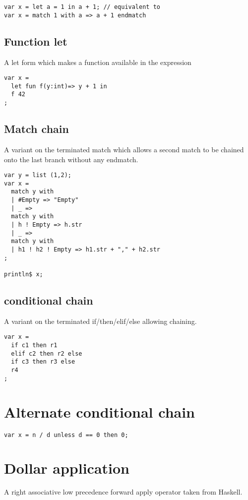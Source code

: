\documentclass[oneside]{book}
\begin{document}
{\begin{verbatim}
var x = let a = 1 in a + 1; // equivalent to
var x = match 1 with a => a + 1 endmatch
\end{verbatim}


\subsection{Function let}
A let form which makes a function available in the
expression

\begin{verbatim}
var x = 
  let fun f(y:int)=> y + 1 in 
  f 42
;
\end{verbatim}

\subsection{Match chain}
A variant on the terminated match which allows a second
match to be chained onto the last branch without any endmatch.

\begin{verbatim}
var y = list (1,2);
var x = 
  match y with
  | #Empty => "Empty"
  | _ =>
  match y with 
  | h ! Empty => h.str
  | _ =>
  match y with 
  | h1 ! h2 ! Empty => h1.str + "," + h2.str
;

println$ x;
\end{verbatim}

\subsection{conditional chain}
A variant on the terminated if/then/elif/else allowing chaining.

\begin{verbatim}
var x = 
  if c1 then r1 
  elif c2 then r2 else
  if c3 then r3 else
  r4
;
\end{verbatim}


\section{Alternate conditional chain}

\begin{verbatim}
var x = n / d unless d == 0 then 0;
\end{verbatim}


\section{Dollar application}
A right associative low precedence forward apply operator taken
from Haskell.

}
\end{document}
